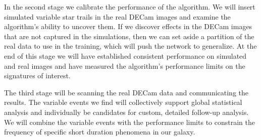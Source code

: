 \documentclass[11pt]{article}
\begin{document}
In the second stage we calibrate the performance of the algorithm. We will insert simulated variable star trails in the real DECam images and examine the algorithm's ability to uncover them. If we discover effects in the DECam images that are not captured in the simulations, then we can set aside a partition of the real data to use in the training, which will push the network to generalize. At the end of this stage we will have established consistent performance on simulated and real images and have measured the algorithm's performance limits on the signatures of interest.

The third stage will be scanning the real DECam data and communicating the results. The variable events we find will collectively support global statistical analysis and individually be candidates for custom, detailed follow-up analysis. We will combine the variable events with the performance limits to constrain the frequency of specific short duration phenomena in our galaxy. 

% 



% 
% 
%
\end{document}
